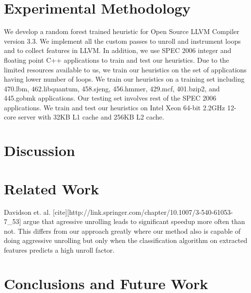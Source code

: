 \documentclass[]{sig-alternate}
\begin{document}



\section{Experimental Methodology}\label{sec:experimental_methodology}
We develop a random forest trained heuristic for Open Source LLVM Compiler version 3.3. We implement all the custom passes to unroll and instrument loops and to collect features in LLVM. In addition, we use SPEC 2006 integer and floating point C++ applications to train and test our heuristics. Due to the limited resources available to us, we train our heuristics on the set of applications having lower number of loops. We train our heuristics on a training set including 470.lbm, 462.libquantum, 458.sjeng, 456.hmmer, 429.mcf, 401.bzip2, and 445.gobmk applications. Our testing set involves rest of the SPEC 2006 applications. We train and test our heuristics on Intel Xeon 64-bit 2.2GHz 12-core server with 32KB L1 cache and 256KB L2 cache.


\section{Discussion}
\label{sec:Discussion}

\section{Related Work}
\label{sec:RelatedWork}

Davidson et. al. [cite][http://link.springer.com/chapter/10.1007/3-540-61053-7_53] argue that agressive unrolling leads to significant speedup more often than not. This differs from our approach greatly where our method also is capable of doing aggressive unrolling but only when the classification algorithm on extracted features predicts a high unroll factor. 

\section{Conclusions and Future Work}
\label{sec:FutureWork}


%

\begin{scriptsize}
  
\end{scriptsize}
\end{document}
